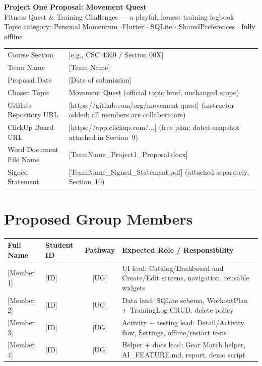 \documentclass[11pt]{article}
\newcommand{\ph}[1]{\textcolor{ph}{[#1]}}
\begin{document}
\begin{center}
{\LARGE\bfseries\color{accent} Project One Proposal: Movement Quest}\\[4pt]
{\large Fitness Quest \& Training Challenges --- a playful, honest training logbook}\\[2pt]
{\small Topic category: Personal Momentum \quad$\cdot$\quad Flutter $\cdot$ SQLite $\cdot$ SharedPreferences $\cdot$ fully offline}
\end{center}

\begin{center}
\begin{tabularx}{0.92\textwidth}{@{}lL@{}}
\toprule
Course Section & \ph{e.g., CSC 4360 / Section 00X} \\
Team Name & \ph{Team Name} \\
Proposal Date & \ph{Date of submission} \\
Chosen Topic & Movement Quest (official topic brief, unchanged scope) \\
GitHub Repository URL & \ph{https://github.com/org/movement-quest} \quad (instructor added; all members are collaborators) \\
ClickUp Board URL & \ph{https://app.clickup.com/...} \quad (free plan; dated snapshot attached in Section~9) \\
Word Document File Name & \ph{TeamName\_Project1\_Proposal.docx} \\
Signed Statement & \ph{TeamName\_Signed\_Statement.pdf} (attached separately, Section~10) \\
\bottomrule
\end{tabularx}
\end{center}

\section{Proposed Group Members}

\begin{tabularx}{\textwidth}{@{}l l c L@{}}
\toprule
\textbf{Full Name} & \textbf{Student ID} & \textbf{Pathway} & \textbf{Expected Role / Responsibility} \\
\midrule
\ph{Member 1} & \ph{ID} & \ph{UG} & UI lead: Catalog/Dashboard and Create/Edit screens, navigation, reusable widgets \\
\ph{Member 2} & \ph{ID} & \ph{UG} & Data lead: SQLite schema, WorkoutPlan + TrainingLog CRUD, delete policy \\
\ph{Member 3} & \ph{ID} & \ph{UG} & Activity + testing lead: Detail/Activity flow, Settings, offline/restart tests \\
\ph{Member 4} & \ph{ID} & \ph{UG} & Helper + docs lead: Gear Match helper, AI\_FEATURE.md, report, demo script \\
\bottomrule
\end{tabularx}
\end{document}
